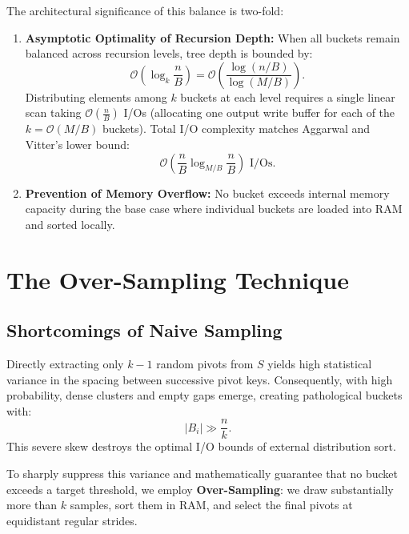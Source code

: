The architectural significance of this balance is two-fold:
\begin{enumerate}
  \item \textbf{Asymptotic Optimality of Recursion Depth:} When all buckets remain balanced across recursion levels, tree depth is bounded by:
  \begin{equation}
    \mathcal{O}\left(\log_k \frac{n}{B}\right) = \mathcal{O}\left(\frac{\log(n/B)}{\log(M/B)}\right).
  \end{equation}
  Distributing elements among $k$ buckets at each level requires a single linear scan taking $\mathcal{O}\left(\frac{n}{B}\right)$ I/Os (allocating one output write buffer for each of the $k = \mathcal{O}(M/B)$ buckets). Total I/O complexity matches Aggarwal and Vitter's lower bound:
  \begin{equation}
    \mathcal{O}\left(\frac{n}{B} \log_{M/B} \frac{n}{B}\right) \text{ I/Os}.
  \end{equation}
  \item \textbf{Prevention of Memory Overflow:} No bucket exceeds internal memory capacity during the base case where individual buckets are loaded into RAM and sorted locally.
\end{enumerate}

\FloatBarrier
\section{The Over-Sampling Technique}
\label{sec:oversampling-technique}

\subsection{Shortcomings of Naive Sampling}
Directly extracting only $k - 1$ random pivots from $S$ yields high statistical variance in the spacing between successive pivot keys. Consequently, with high probability, dense clusters and empty gaps emerge, creating pathological buckets with:
\begin{equation}
  |B_i| \gg \frac{n}{k}.
\end{equation}
This severe skew destroys the optimal I/O bounds of external distribution sort.

To sharply suppress this variance and mathematically guarantee that no bucket exceeds a target threshold, we employ \textbf{Over-Sampling}: we draw substantially more than $k$ samples, sort them in RAM, and select the final pivots at equidistant regular strides.

